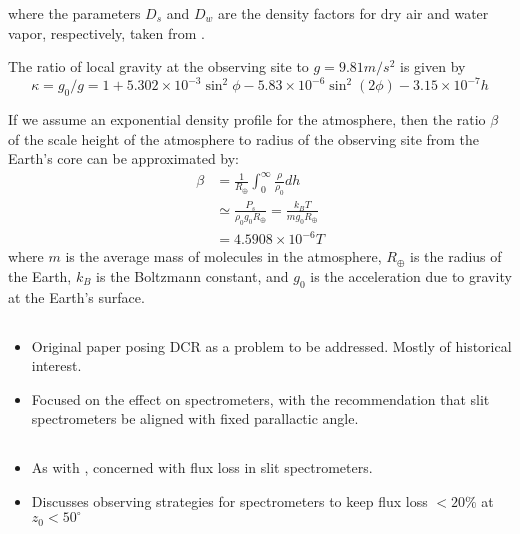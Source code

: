 \documentclass[DM,authoryear,toc]{lsstdoc}
\begin{document}
where the parameters $D_s$ and $D_w$ are the density factors for dry air and water vapor, respectively, taken from \cite{1967ApOpt...6...51O}.

The ratio of local gravity at the observing site to $g = 9.81 m/s^2$ is given by
\begin{equation}
\kappa = g_0/g = 1 + 5.302\times 10^{-3} \sin^2\phi - 5.83\times 10^{-6} \sin^2(2\phi) - 3.15\times 10^{-7} h \label{eqn:kappa}
\end{equation}

If we assume an exponential density profile for the atmosphere, then the ratio $\beta$ of the scale height of the atmosphere to radius of the observing site from the Earth's core can be approximated by:
\begin{align}
	\beta &= \frac{1}{R_\oplus}\int_{0}^\infty \frac{\rho}{\rho_0} dh \nonumber \\
	&\simeq \frac{P_s}{\rho_0g_0 R_\oplus} = \frac{k_BT}{m g_0 R_\oplus} \nonumber \\
	&=  4.5908\times 10^{-6} T \label{eqn:beta}
\end{align}
where $m$ is the average mass of molecules in the atmosphere, $R_\oplus$ is the radius of the Earth, $k_B$ is the Boltzmann constant, and $g_0$ is the acceleration due to gravity at the Earth's surface.



\subsection{\cite{1982PASP...94..715F}}
\begin{itemize}
	\item Original paper posing DCR as a problem to be addressed. Mostly of historical interest.
	\item Focused on the effect on spectrometers, with the
	recommendation that slit spectrometers be aligned with fixed
	parallactic angle. 
\end{itemize}

\subsection{\cite{1998SPIE.3355...36C}}
\begin{itemize}
	\item As with \citeauthor{1982PASP...94..715F}, concerned with flux loss in slit spectrometers. 
	\item Discusses observing strategies for spectrometers to keep flux loss $< 20\%$ at $z_0<50^\circ$
\end{itemize}

\subsection{\cite{1996AJ....112.2872T}}
\subsection{\cite{2015PASP..127...74M}}
\subsection{\cite{2000AJ....119.2472A}}


\end{document}
